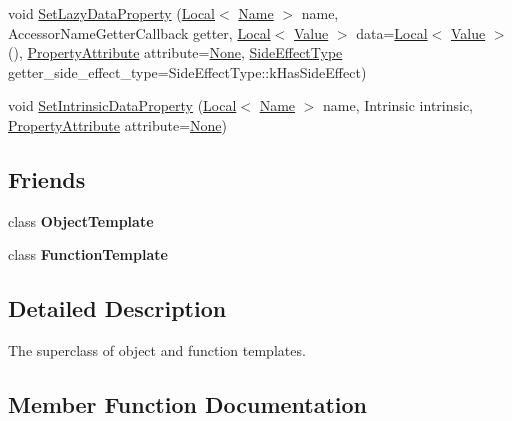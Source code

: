 \begin{DoxyCompactItemize}
\item 
void \mbox{\hyperlink{classv8_1_1Template_a983acad576914228a522965fac87c786}{Set\+Lazy\+Data\+Property}} (\mbox{\hyperlink{classv8_1_1Local}{Local}}$<$ \mbox{\hyperlink{classv8_1_1Name}{Name}} $>$ name, Accessor\+Name\+Getter\+Callback getter, \mbox{\hyperlink{classv8_1_1Local}{Local}}$<$ \mbox{\hyperlink{classv8_1_1Value}{Value}} $>$ data=\mbox{\hyperlink{classv8_1_1Local}{Local}}$<$ \mbox{\hyperlink{classv8_1_1Value}{Value}} $>$(), \mbox{\hyperlink{namespacev8_a05f25f935e108a1ea2d150e274602b87}{Property\+Attribute}} attribute=\mbox{\hyperlink{namespacev8_a05f25f935e108a1ea2d150e274602b87a7ab4d58719c33b3ea2dfaefa29b111df}{None}}, \mbox{\hyperlink{namespacev8_a29711319c2b9fc7716d65faee2f7b9cb}{Side\+Effect\+Type}} getter\+\_\+side\+\_\+effect\+\_\+type=Side\+Effect\+Type\+::k\+Has\+Side\+Effect)
\item 
void \mbox{\hyperlink{classv8_1_1Template_aef172ef714818a210d815de389a5ab77}{Set\+Intrinsic\+Data\+Property}} (\mbox{\hyperlink{classv8_1_1Local}{Local}}$<$ \mbox{\hyperlink{classv8_1_1Name}{Name}} $>$ name, Intrinsic intrinsic, \mbox{\hyperlink{namespacev8_a05f25f935e108a1ea2d150e274602b87}{Property\+Attribute}} attribute=\mbox{\hyperlink{namespacev8_a05f25f935e108a1ea2d150e274602b87a7ab4d58719c33b3ea2dfaefa29b111df}{None}})
\end{DoxyCompactItemize}
\subsection*{Friends}
\begin{DoxyCompactItemize}
\item 
\mbox{\label{classv8_1_1Template_a4d28646409234f556983be8a96c06424}} 
class {\bfseries Object\+Template}
\item 
\mbox{\label{classv8_1_1Template_a334168ad1a5f39cf17b818ca3356aacd}} 
class {\bfseries Function\+Template}
\end{DoxyCompactItemize}


\subsection{Detailed Description}
The superclass of object and function templates. 

\subsection{Member Function Documentation}
\mbox{\label{classv8_1_1Template_a623b9f0cdd87dc861516f276cc9a7cfa}} 
